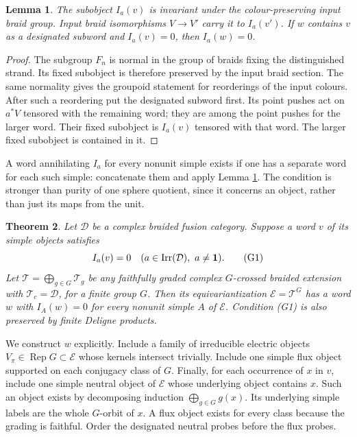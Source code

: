 \documentclass[10pt]{amsart}
\newcommand{\one}{\mathbf1}\newcommand{\C}{\mathcal C}
\newcommand{\D}{\mathcal D}\newcommand{\E}{\mathcal E}
\newtheorem{theorem}{Theorem}[section]
\newtheorem{lemma}[theorem]{Lemma}
\begin{document}
\begin{lemma}\label{normal}
The subobject $I_a(v)$ is invariant under the colour-preserving
input braid group. Input braid isomorphisms $V\to V'$ carry it
to $I_a(v')$. If $w$ contains $v$ as a designated subword and
$I_a(v)=0$, then $I_a(w)=0$.
\end{lemma}
\begin{proof}
The subgroup $F_n$ is normal in the group of braids fixing
the distinguished strand. Its fixed subobject is therefore
preserved by the input braid section. The same normality gives
the groupoid statement for reorderings of the input colours.
After such a reordering put the designated subword first.
Its point pushes act on $a^*V$ tensored with the remaining
word; they are among the point pushes for the larger word.
Their fixed subobject is $I_a(v)$ tensored with that word.
The larger fixed subobject is contained in it.
\end{proof}

A word annihilating $I_a$ for every nonunit simple exists
if one has a separate word for each such simple: concatenate
them and apply Lemma \ref{normal}. The condition is stronger
than purity of one sphere quotient, since it concerns an
object, rather than just its maps from the unit.

\begin{theorem}\label{closure}
Let $\D$ be a complex braided fusion category. Suppose a word $v$ of
its simple objects satisfies
\[
                         I_a(v)=0\quad(a\in\Irr(\D),\ a\ne\one).
                                                               \tag{G1}
\]
Let $\mathcal T=\bigoplus_{g\in G}\mathcal T_g$ be any faithfully
graded complex $G$-crossed braided extension with
$\mathcal T_e=\D$, for a finite group $G$.
Then its equivariantization $\E=\mathcal T^G$ has a word $w$
with $I_A(w)=0$ for every nonunit simple $A$ of $\E$.
Condition (G1) is also preserved by finite Deligne products.
\end{theorem}

We construct $w$ explicitly. Include a family of irreducible
electric objects $V_\pi\in\operatorname{Rep}G\subset\E$
whose kernels intersect trivially. Include one simple flux
object supported on each conjugacy class of $G$.
Finally, for each occurrence of $x$ in $v$, include one simple
neutral object of $\E$ whose underlying object contains $x$.
Such an object exists by decomposing induction
$\bigoplus_{g\in G}g(x)$.
Its underlying simple labels are the whole $G$-orbit of $x$.
A flux object exists for every class because the grading is faithful.
Order the designated neutral probes before the flux probes.
\end{document}
